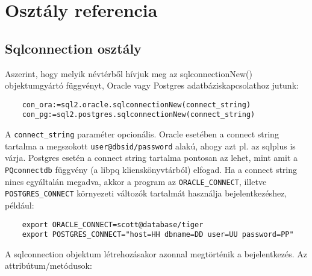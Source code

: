 
\section{Osztály referencia}

\subsection{Sqlconnection osztály}

Aszerint, hogy melyik névtérből hívjuk meg az sqlconnectionNew()
objektumgyártó függvényt, Oracle vagy Postgres adatbáziskapcsolathoz
jutunk:
\begin{verbatim}
    con_ora:=sql2.oracle.sqlconnectionNew(connect_string)
    con_pg:=sql2.postgres.sqlconnectionNew(connect_string)
\end{verbatim}
A \verb!connect_string! paraméter opcionális. Oracle esetében
a connect string tartalma a megszokott \verb!user@dbsid/password! alakú, 
ahogy azt pl. az sqlplus is várja. Postgres esetén a connect string
tartalma pontosan az lehet, mint amit a \verb!PQconnectdb! függvény
(a libpq klienskönyvtárból) elfogad. Ha a connect string
nincs egyáltalán megadva, akkor a program az \verb!ORACLE_CONNECT!, illetve
\verb!POSTGRES_CONNECT! környezeti változók tartalmát használja
bejelentkezéshez, például:
\begin{verbatim}
    export ORACLE_CONNECT=scott@database/tiger
    export POSTGRES_CONNECT="host=HH dbname=DD user=UU password=PP"
\end{verbatim}
A sqlconnection objektum létrehozásakor azonnal megtörténik
a bejelentkezés. Az attribútum/metódusok:

